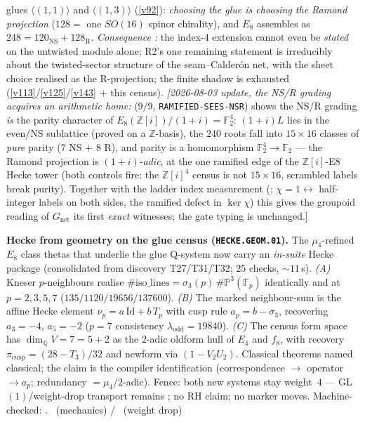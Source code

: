 \documentclass[11pt,a4paper]{article}
\newcommand{\Z}{\mathbb Z}
\begin{document}
glues $\langle(1,1)\rangle$ and $\langle(1,3)\rangle$ (\vref{v92}): \emph{choosing the glue is choosing
the Ramond projection} ($128=$ one $SO(16)$ spinor chirality), and $E_8$ assembles as
$248=120_{\mathrm{NS}}+128_{\mathrm R}$. \emph{Consequence \mC:} the index-$4$ extension cannot even be
\emph{stated} on the untwisted module alone; R2's one remaining statement is irreducibly about the
twisted-sector structure of the seam--Calder\'on net, with the sheet choice realised as the R-projection;
the finite shadow is exhausted (\vref{v113}/\vref{v125}/\vref{v143} $+$ this census).
\emph{[2026-08-03 update, the NS/R grading acquires an arithmetic
home:}  ($9/9$,
\texttt{RAMIFIED-SEES-NSR}) shows the NS/R grading \emph{is} the
parity character of $E_8(\Z[i])/(1{+}i)=\mathbb F_2^4$: $(1{+}i)L$
lies in the even/NS sublattice (proved on a $\Z$-basis), the $240$
roots fall into $15\times16$ classes of \emph{pure} parity ($7$ NS
$+$ $8$ R), and parity is a homomorphism $\mathbb
F_2^4\to\mathbb F_2$ --- the Ramond projection is
$(1{+}i)$-\emph{adic}, at the one ramified edge of the
$\Z[i]$-E8 Hecke tower (both controls fire: the $\Z[i]^4$ census is
not $15\times16$, scrambled labels break purity).  Together with
the ladder index measurement (;
$\chi=1\leftrightarrow$ half-integer labels on both sides, the
ramified defect in $\ker\chi$) this gives the groupoid reading of
$G_{\mathrm{net}}$ its first \emph{exact} witnesses; the gate
typing is unchanged.]

\par\smallskip\noindent\textbf{Hecke from geometry on the glue census
(\texttt{HECKE.GEOM.01}).}
The $\mu_4$-refined $E_8$ class thetas that underlie the glue Q-system now carry an
\emph{in-suite} Hecke package (consolidated from discovery T27/T31/T32; $25$ checks,
$\sim11$\,s).
\emph{(A)} Kneser $p$-neighbours realise
$\#\mathrm{iso\_lines}=\sigma_3(p)\,\#\mathbb P^3(\mathbb F_p)$ identically and at
$p=2,3,5,7$ ($135/1120/19656/137600$).
\emph{(B)} The marked neighbour-sum is the affine Hecke element
$\nu_p=a\,\mathrm{Id}+b\,T_p$ with cusp rule $a_p=b-\sigma_3$, recovering
$a_3=-4$, $a_5=-2$ ($p=7$ consistency $\lambda_{\mathrm{odd}}=19840$).
\emph{(C)} The census form space has $\dim_{\mathbb Q}V=7=5{+}2$ as the $2$-adic oldform
hull of $E_4$ and $f_8$, with recovery $\pi_{\mathrm{cusp}}=(28-T_3)/32$ and newform via
$(1-V_2U_2)$. Classical theorems named classical; the claim is the compiler identification
(correspondence $\to$ operator $\to a_p$; redundancy $=\mu_4$/$2$-adic). Fence: both new
systems stay weight~$4$ --- GL$(1)$/weight-drop transport remains \mO; no RH claim; no
marker moves. Machine-checked: .
\mE\ (mechanics) / \mO\ (weight drop)
\end{document}
